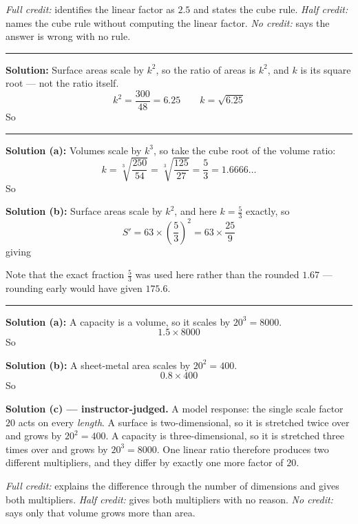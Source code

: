 \documentclass[12pt]{article}
\begin{document}
\emph{Full credit:} identifies the linear factor as $2.5$ and states the cube rule. \emph{Half credit:} names the cube rule without computing the linear factor. \emph{No credit:} says the answer is wrong with no rule.

\vspace{0.2cm}\noindent\rule{\linewidth}{0.2pt}


\textbf{Solution:} Surface areas scale by $k^2$, so the ratio of areas is $k^2$, and $k$ is its square root --- not the ratio itself.
\[ k^2 = \frac{300}{48} = 6.25 \qquad k = \sqrt{6.25} \]
So 

\vspace{0.2cm}\noindent\rule{\linewidth}{0.2pt}


\textbf{Solution (a):} Volumes scale by $k^3$, so take the cube root of the volume ratio:
\[ k = \sqrt[3]{\frac{250}{54}} = \sqrt[3]{\frac{125}{27}} = \frac{5}{3} = 1.6666\ldots \]
So 

\textbf{Solution (b):} Surface areas scale by $k^2$, and here $k = \frac{5}{3}$ exactly, so
\[ S' = 63 \times \left(\frac{5}{3}\right)^2 = 63 \times \frac{25}{9} \]
giving 

Note that the exact fraction $\frac{5}{3}$ was used here rather than the rounded $1.67$ --- rounding early would have given $175.6$.

\vspace{0.2cm}\noindent\rule{\linewidth}{0.2pt}


\textbf{Solution (a):} A capacity is a volume, so it scales by $20^3 = 8000$.
\[ 1.5 \times 8000 \]
So 

\textbf{Solution (b):} A sheet-metal area scales by $20^2 = 400$.
\[ 0.8 \times 400 \]
So 

\textbf{Solution (c) --- instructor-judged.} A model response: the single scale factor $20$ acts on every \emph{length}. A surface is two-dimensional, so it is stretched twice over and grows by $20^2 = 400$. A capacity is three-dimensional, so it is stretched three times over and grows by $20^3 = 8000$. One linear ratio therefore produces two different multipliers, and they differ by exactly one more factor of $20$.

\emph{Full credit:} explains the difference through the number of dimensions and gives both multipliers. \emph{Half credit:} gives both multipliers with no reason. \emph{No credit:} says only that volume grows more than area.
\end{document}
